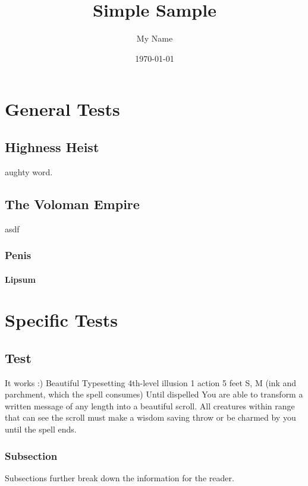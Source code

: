 \documentclass[letterpaper,twocolumn,openany,hidelinks]{memoir}
\title{Simple Sample} %
\author{My Name} %
\date{\today} %
\begin{document}
\begin{KeepFromToc}
	\tableofcontents
\end{KeepFromToc}

\part{General Tests}

\chapter{Highness Heist}

aughty word.
\lipsum[1]


\chapter{The Voloman Empire}

asdf

\section{Penis}
\subsection{Lipsum}
\lipsum

\part{Specific Tests}

\chapter{Test}
It works :)
\RPGSpellHeader
	{Beautiful Typesetting}
	{4th-level illusion}
	{1 action}
	{5 feet}
	{S, M (ink and parchment, which the spell consumes)}
	{Until dispelled}
You are able to transform a written message of any length into a beautiful scroll. All creatures within range that can see the scroll must make a wisdom saving throw or be charmed by you until the spell ends.

\section{Subsection}
Subsections further break down the information for the reader.
\end{document}
